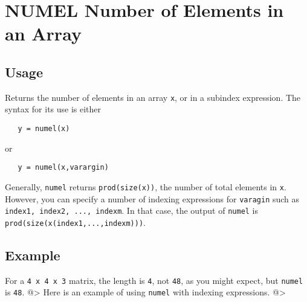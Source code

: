 \section{NUMEL Number of Elements in an Array}

\subsection{Usage}

Returns the number of elements in an array \verb|x|, or in a subindex
expression.  The syntax for its use is either
\begin{verbatim}
   y = numel(x)
\end{verbatim}
or 
\begin{verbatim}
   y = numel(x,varargin)
\end{verbatim}
Generally, \verb|numel| returns \verb|prod(size(x))|, the number of total
elements in \verb|x|.  However, you can specify a number of indexing
expressions for \verb|varagin| such as \verb|index1, index2, ..., indexm|.
In that case, the output of \verb|numel| is 
\verb|prod(size(x(index1,...,indexm)))|.
\subsection{Example}

For a \verb|4 x 4 x 3| matrix, the length is \verb|4|, not \verb|48|, as you 
might expect, but \verb|numel| is \verb|48|.
@>
Here is an example of using \verb|numel| with indexing expressions.
@>
